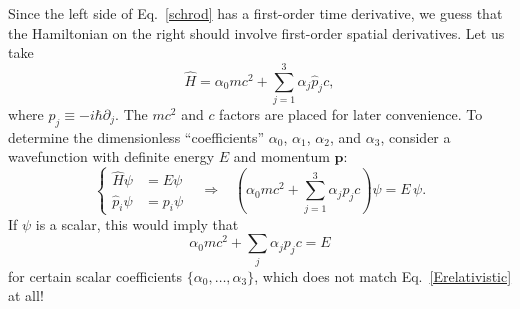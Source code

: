 \documentclass[prx,12pt]{revtex4-2}
\begin{document}
Since the left side of Eq.~\eqref{schrod} has a first-order time
derivative, we guess that the Hamiltonian on the right should involve
first-order spatial derivatives.  Let us take
\begin{equation}
  \hat{H} = \alpha_0 mc^2 + \sum_{j=1}^3 \alpha_j \hat{p}_j c,
  \label{Dirac0}
\end{equation}
where $\hat{p}_j \equiv -i\hbar \partial_j$.  The $mc^2$ and $c$
factors are placed for later convenience.  To determine the
dimensionless ``coefficients'' $\alpha_0$, $\alpha_1$, $\alpha_2$, and
$\alpha_3$, consider a wavefunction with definite energy $E$ and
momentum $\mathbf{p}$:
\begin{equation}
  \left\{\begin{aligned}\hat{H}\psi &= E \psi \\
  \hat{p}_i \psi &= p_i \psi
  \end{aligned}\right.
    \;\;\;\Rightarrow \;\;\;
  \left(\alpha_0mc^2 + \sum_{j=1}^3\alpha_j p_jc\right) \psi = E\,\psi.
\end{equation}
If $\psi$ is a scalar, this would imply that
\begin{equation*}
  \alpha_0 mc^2 + \sum_{j}\alpha_j p_j c = E
\end{equation*}
for certain scalar coefficients $\{\alpha_0, \dots, \alpha_3\}$, which
does not match Eq.~\eqref{Erelativistic} at all!
\end{document}
